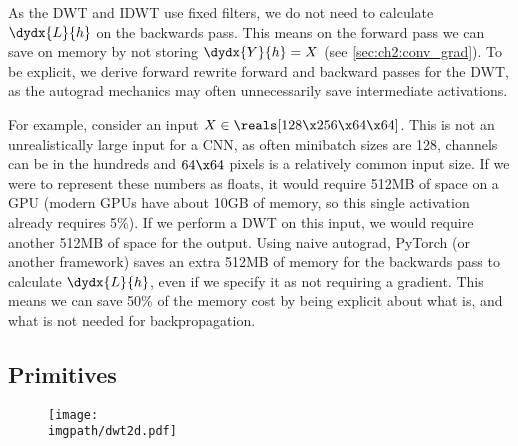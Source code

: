 As the DWT and IDWT use fixed filters, we do not need to calculate
$\dydx{L}{h}$ on the backwards pass. This means on the forward pass we
can save on memory by not storing $\dydx{Y}{h} = X$ (see
\autoref{sec:ch2:conv_grad}). To be explicit, we derive forward rewrite forward
and backward passes for the DWT, as the autograd mechanics may often
unnecessarily save intermediate activations.

For example, consider an input $X \in \reals[128\x 256\x 64\x 64]$. This is not
an unrealistically large input for a CNN, as often minibatch sizes are 128,
channels can be in the hundreds and $64\x 64$ pixels is a relatively common 
input size. If we were to represent these numbers as floats, it would require
512MB of space on a GPU (modern GPUs have about 10GB of memory, so this single
activation already requires 5\%). If we perform a DWT on this input, we would
require another 512MB of space for the output. Using naive autograd, PyTorch
(or another framework) saves an extra 512MB of memory for the backwards pass
to calculate $\dydx{L}{h}$, even if we specify it as not requiring a gradient.
This means we can save 50\% of the memory cost by being explicit about what is,
and what is not needed for backpropagation.



\subsection{Primitives}\label{sec:ch3:primitives}
\begin{figure}
  \centering
  \texttt{[image: \\imgpath/dwt2d.pdf]}
  \label{fig:ch3:dwt}
\end{figure}

